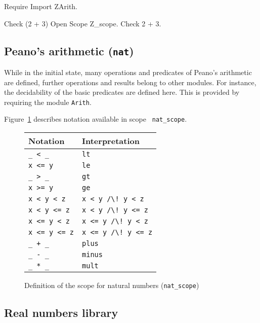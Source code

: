 \begin{coq_example*}
Require Import ZArith.
\end{coq_example*}
\begin{coq_example}
Check  (2 + 3)%
Open Scope Z_scope.
Check 2 + 3.
\end{coq_example}

\subsection[Peano's arithmetic (\texttt{nat})]{Peano's arithmetic (\texttt{nat})
}

While in the initial state, many operations and predicates of Peano's
arithmetic are defined, further operations and results belong to other
modules. For instance, the decidability of the basic predicates are
defined here. This is provided by requiring the module {\tt Arith}.

Figure~\ref{nat-syntax} describes notation available in scope {\tt
nat\_scope}.

\begin{figure}
\begin{center}
\begin{tabular}{l|l}
Notation & Interpretation \\
\hline
\verb!_ < _! & {\tt lt} \\
\verb!x <= y! & {\tt le} \\
\verb!_ > _! & {\tt gt} \\
\verb!x >= y! & {\tt ge} \\
\verb!x < y < z! & {\tt x < y \verb!/\! y < z} \\
\verb!x < y <= z! & {\tt x < y \verb!/\! y <= z} \\
\verb!x <= y < z! & {\tt x <= y \verb!/\! y < z} \\
\verb!x <= y <= z! & {\tt x <= y \verb!/\! y <= z} \\
\verb!_ + _! & {\tt plus} \\
\verb!_ - _! & {\tt minus} \\
\verb!_ * _! & {\tt mult} \\
\end{tabular}
\end{center}
\caption{Definition of the scope for natural numbers ({\tt nat\_scope})}
\label{nat-syntax}
\end{figure}

\subsection{Real numbers library}

